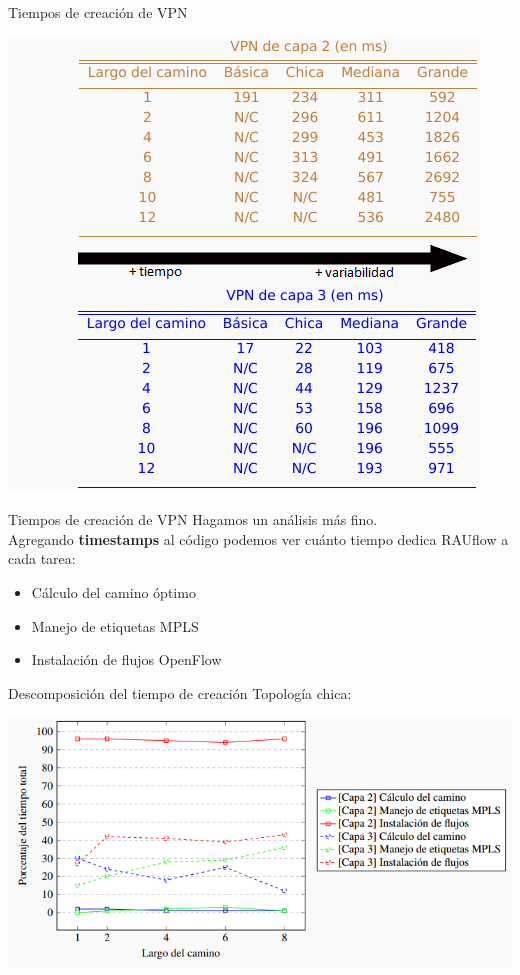 \documentclass[xcolor=svgnames]{beamer}
\begin{document}
\begin{frame}{Tiempos de creación de VPN}
	\begin{center}
		\includegraphics[height=0.9\textheight]{tiempos_vpn_topologia}
	\end{center}
\end{frame}

\begin{frame}{Tiempos de creación de VPN}
	Hagamos un análisis más fino. \\
	\vspace{4mm}
	Agregando \textbf{timestamps} al código podemos ver cuánto tiempo dedica RAUflow a cada tarea:
	\begin{itemize}
		\item Cálculo del camino óptimo
		\item Manejo de etiquetas MPLS
		\item Instalación de flujos OpenFlow
	\end{itemize}
\end{frame}

\begin{frame}{Descomposición del tiempo de creación}
	Topología chica:
	\begin{center}
		\includegraphics[scale=0.6]{porcentajes_tiempos_chica}
	\end{center}
\end{frame}
\end{document}

